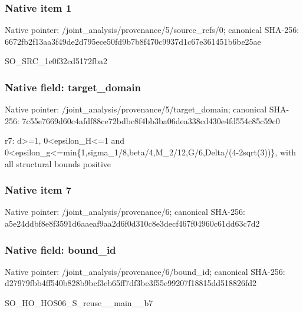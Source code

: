 \documentclass[10pt,a4paper]{article}
\begin{document}
\subsubsection{Native item 1}
Native pointer: /joint\_\allowbreak{}analysis/provenance/5/source\_\allowbreak{}refs/0; canonical SHA-256: 6672fb2f13aa3f49de2d795ece50fd9b7b8f470c9937d1c67e361451b6be25ae

\begingroup\raggedright\sloppy SO\_\allowbreak{}SRC\_\allowbreak{}1e0f32cd5172fba2\par\endgroup

\subsubsection{Native field: target\_\allowbreak{}domain}
Native pointer: /joint\_\allowbreak{}analysis/provenance/5/target\_\allowbreak{}domain; canonical SHA-256: 7c55e7669d60c4afdf88ce72bdbc8f4bb3ba06dea338cd430e4fd554c85c59c0

\begingroup\raggedright\sloppy r7:\allowbreak{} d>=\allowbreak{}1,\allowbreak{} 0<epsilon\_\allowbreak{}H<=\allowbreak{}1 and 0<epsilon\_\allowbreak{}g<=\allowbreak{}min\{1,\allowbreak{}sigma\_\allowbreak{}1/\allowbreak{}8,\allowbreak{}beta/\allowbreak{}4,\allowbreak{}M\_\allowbreak{}2/\allowbreak{}12,\allowbreak{}G/\allowbreak{}6,\allowbreak{}Delta/\allowbreak{}(4-2sqrt(3))\},\allowbreak{} with all structural bounds positive\par\endgroup

\subsubsection{Native item 7}
Native pointer: /joint\_\allowbreak{}analysis/provenance/6; canonical SHA-256: a5e24ddbf8e8f3591d6aaeaf9aa2d6f0d310c8e3decf467f04960c61dd63c7d2

\subsubsection{Native field: bound\_\allowbreak{}id}
Native pointer: /joint\_\allowbreak{}analysis/provenance/6/bound\_\allowbreak{}id; canonical SHA-256: d27979fbb4ff540b828b9bcf3eb65ff7df3be3f55e99207f18815dd518826fd2

\begingroup\raggedright\sloppy SO\_\allowbreak{}HO\_\allowbreak{}HOS06\_\allowbreak{}S\_\allowbreak{}reuse\_\allowbreak{}\_\allowbreak{}main\_\allowbreak{}\_\allowbreak{}b7\par\endgroup
\end{document}
